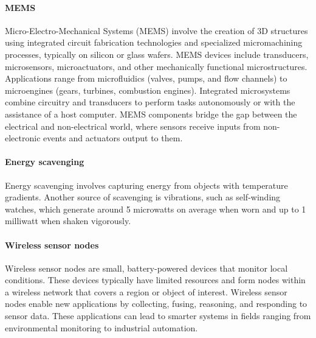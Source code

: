 \paragraph*{MEMS}
Micro-Electro-Mechanical Systems (MEMS) involve the creation of 3D structures using integrated circuit fabrication technologies and specialized micromachining processes, typically on silicon or glass wafers. 
MEMS devices include transducers, microsensors, microactuators, and other mechanically functional microstructures. 
Applications range from microfluidics (valves, pumps, and flow channels) to microengines (gears, turbines, combustion engines).
Integrated microsystems combine circuitry and transducers to perform tasks autonomously or with the assistance of a host computer.
MEMS components bridge the gap between the electrical and non-electrical world, where sensors receive inputs from non-electronic events and actuators output to them.

\paragraph*{Energy scavenging}
Energy scavenging involves capturing energy from objects with temperature gradients. 
Another source of scavenging is vibrations, such as self-winding watches, which generate around 5 microwatts on average when worn and up to 1 milliwatt when shaken vigorously.

\paragraph*{Wireless sensor nodes}
Wireless sensor nodes are small, battery-powered devices that monitor local conditions.
These devices typically have limited resources and form nodes within a wireless network that covers a region or object of interest. 
Wireless sensor nodes enable new applications by collecting, fusing, reasoning, and responding to sensor data. 
These applications can lead to smarter systems in fields ranging from environmental monitoring to industrial automation.